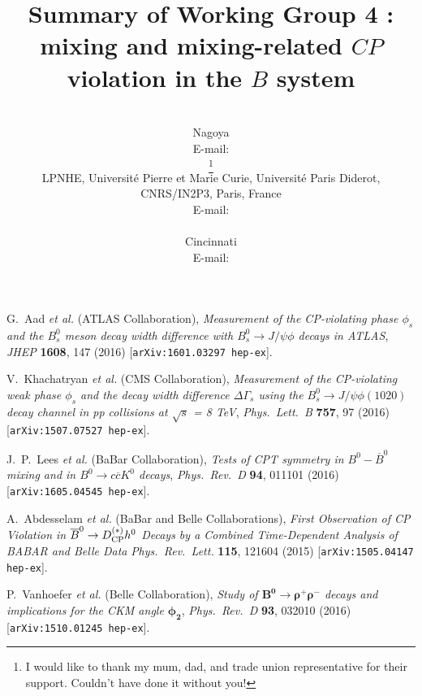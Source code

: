 \documentclass{PoS}
\title{Summary of Working Group 4 : mixing and mixing-related $CP$ violation in the $B$ system}
\author{\speaker{Alessandro Gaz}\\
        Nagoya\\
        E-mail: \email{gaz@hepl.phys.nagoya-u.ac.jp}\\
        \speaker{Vladimir V. Gligorov}\thanks{I would like to thank my mum, dad, and trade union representative for their support. Couldn't have done it without you!}\\
        LPNHE, Universit\'{e} Pierre et Marie Curie, Universit\'{e} Paris Diderot, CNRS/IN2P3, Paris, France\\
        E-mail: \email{vgligoro@lpnhe.in2p3.fr}\\
        \speaker{Dean Robinson}\\
        Cincinnati\\
        E-mail: \email{dean.robinson@uc.edu}\\
        }
\begin{document}


%
%
%







%



\begin{thebibliography}{99}


  G.~Aad \emph{et al.} (ATLAS Collaboration),
  \emph{Measurement of the CP-violating phase $\phi_s$ and the $B^0_s$ meson decay width
    difference with $B^0_s \to J/\psi \phi$ decays in ATLAS},
  \emph{JHEP} {\bf 1608}, 147 (2016) [{\tt arXiv:1601.03297 hep-ex}].

  V.~Khachatryan \emph{et al.} (CMS Collaboration),
  \emph{Measurement of the CP-violating weak phase $\phi_s$ and the decay width difference
    $\Delta\Gamma_s$ using the $B^0_s \to J/\psi \phi(1020)$ decay channel in pp collisions
    at $\sqrt{s}$ = 8 TeV},
  \emph{Phys.~Lett.~B} {\bf 757}, 97 (2016) [{\tt arXiv:1507.07527 hep-ex}].

  J.~P.~Lees \emph{et al.} (BaBar Collaboration),
  \emph{Tests of CPT symmetry in $B^0-\overline{B}^0$ mixing and in $B^0 \to c\overline{c}K^0$ decays},
  \emph{Phys.~Rev.~D} {\bf 94}, 011101 (2016) [{\tt arXiv:1605.04545 hep-ex}].

  A.~Abdesselam \emph{et al.} (BaBar and Belle Collaborations),
  \emph{First Observation of CP Violation in $\overline{B}^0 \to
      D^{(*)}_{\rm CP} h^0$ Decays by a Combined Time-Dependent Analysis of BABAR and Belle Data}
  \emph{Phys.~Rev.~Lett.} {\bf 115}, 121604 (2015) [{\tt arXiv:1505.04147 hep-ex}].
  
  P.~Vanhoefer  \emph{et al.} (Belle Collaboration),
  \emph{Study of $\mathbf{B^{0}\rightarrow\rho^{+}\rho^{-}}$
    decays and implications for the CKM angle $\mathbf{\phi_2}$},
  \emph{Phys.~Rev.~D} {\bf 93}, 032010 (2016) [{\tt arXiv:1510.01245 hep-ex}].
  
\end{thebibliography}
  
\end{document}
